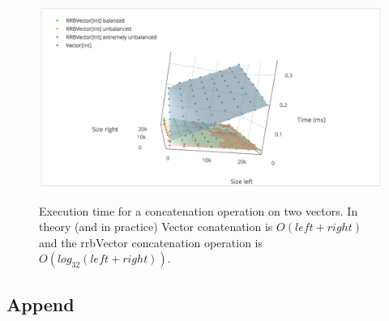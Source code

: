 \begin{figure}[h!]
  \centering
  \includegraphics[width=\textwidth]{Benchmarks/Concat.png}
  \label{ConcatBenchmarks}
  \caption{Execution time for a concatenation operation on two vectors. In theory (and in practice) Vector conatenation is $O(left + right)$ and the rrbVector concatenation operation is $O(log_{32}(left + right))$.}
\end{figure}

\subsection{Append}

